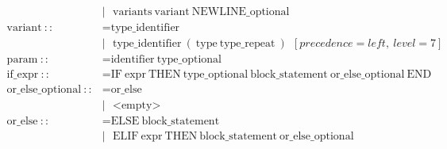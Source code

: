 \documentclass[a4paper,12pt]{book} %
\begin{document}
\begin{align*}
                                      & |\ \ \ \text{variants}\ \text{variant}\ \text{NEWLINE\_optional}                                                                                                                                                          \\
  \text{variant}\ ::                  & = \text{type\_identifier}                                                                                                                                                                                                 \\
                                      & |\ \ \ \text{type\_identifier}\ (\ \text{type}\ \text{type\_repeat}\ )\ \ [precedence=left,\ level=7]                                                                                                                     \\
  \text{param}\ ::                    & = \text{identifier}\ \text{type\_optional}                                                                                                                                                                                \\
  \text{if\_expr}\ ::                 & = \text{IF}\ \text{expr}\ \text{THEN}\ \text{type\_optional}\ \text{block\_statement}\ \text{or\_else\_optional}\ \text{END}                                                                                              \\
  \text{or\_else\_optional}\ ::       & = \text{or\_else}                                                                                                                                                                                                         \\
                                      & |\ \ \ \text{<empty>}                                                                                                                                                                                                     \\
  \text{or\_else}\ ::                 & = \text{ELSE}\ \text{block\_statement}                                                                                                                                                                                    \\
                                      & |\ \ \ \text{ELIF}\ \text{expr}\ \text{THEN}\ \text{block\_statement}\ \text{or\_else\_optional}                                                                                                                          \\

\end{align*}
\end{document}
